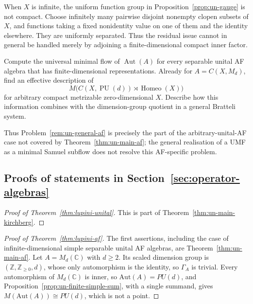 When \(X\) is infinite, the uniform function group in
Proposition~\ref{prop:un-gauge} is not compact. Choose infinitely
many pairwise disjoint nonempty clopen subsets of \(X\), and
functions taking a fixed nonidentity value on one of them and
the identity elsewhere. They are uniformly separated.
Thus the residual issue cannot in general be handled merely by
adjoining a finite-dimensional compact inner factor.

\begin{remark}[Question]\label{rem:un-general-af}
Compute the universal minimal flow of \(\operatorname{Aut}(A)\) for every separable
unital AF algebra that has finite-dimensional representations.
Already for \(A=C(X,M_d)\), find an effective description of
\[
 M\bigl(C(X,\operatorname{PU}(d))
             \rtimes\operatorname{Homeo}(X)\bigr)
\]
for arbitrary compact metrizable zero-dimensional \(X\).
Describe how this information combines with the dimension-group
quotient in a general Bratteli system.
\end{remark}

Thus Problem~\ref{rem:un-general-af} is precisely the part of the
arbitrary-unital-AF case not covered by Theorem~\ref{thm:un-main-af};
the general realisation of a UMF as a minimal Samuel subflow does
not resolve this AF-specific problem.

\subsection{Proofs of statements in Section~\ref{sec:operator-algebras}}\label{sec:un-encyclopaedia-proofs}

\begin{proof}[Proof of Theorem~\ref{thm:lupini-unital}]
This is part of Theorem~\ref{thm:un-main-kirchberg}.
\end{proof}

\begin{proof}[Proof of Theorem~\ref{thm:lupini-af}]
The first assertions, including the case of infinite-dimensional simple
separable unital AF algebras, are Theorem~\ref{thm:un-main-af}. Let
$A=M_d(\mathbb{C})$ with $d\geq2$. Its scaled dimension group is
$(\mathbb{Z},\mathbb{Z}_{\geq0},d)$, whose only automorphism is the identity,
so $\Gamma_A$ is trivial. Every automorphism of $M_d(\mathbb{C})$ is inner, so
$\mathrm{Aut}(A)=PU(d)$, and Proposition~\ref{prop:un-finite-simple-sum}, with
a single summand, gives $M(\mathrm{Aut}(A))\cong PU(d)$, which is not a
point.
\end{proof}
